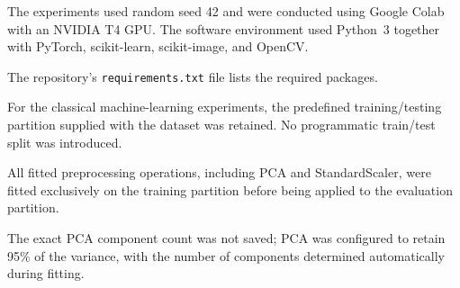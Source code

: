 \documentclass[11pt,a4paper]{article}
\begin{document}
The experiments used random seed 42 and were conducted using Google Colab with an NVIDIA T4 GPU. The software environment used Python~3 together with PyTorch, scikit-learn, scikit-image, and OpenCV.

The repository's \texttt{requirements.txt} file lists the required packages.

For the classical machine-learning experiments, the predefined training/testing partition supplied with the dataset was retained. No programmatic train/test split was introduced.

All fitted preprocessing operations, including PCA and StandardScaler, were fitted exclusively on the training partition before being applied to the evaluation partition.

The exact PCA component count was not saved; PCA was configured to retain 95\% of the variance, with the number of components determined automatically during fitting.




\end{document}
